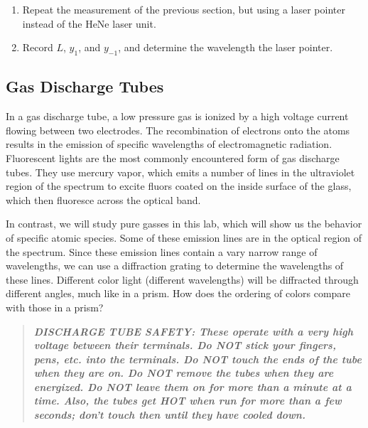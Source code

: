 \documentclass[12pt]{article}
\begin{document}
\begin{enumerate}
\item Repeat the measurement of the previous section, but using a
  laser pointer instead of the HeNe laser unit.  
\item Record $L$, $y_1$, and $y_{-1}$, and determine the wavelength
  the laser pointer.
\end{enumerate}

\subsection{Gas Discharge Tubes}
\label{sec:tubes}

In a gas discharge tube, a low pressure gas is ionized by a high
voltage current flowing between two electrodes.  The recombination of
electrons onto the atoms results in the emission of specific
wavelengths of electromagnetic radiation.  Fluorescent lights are the
most commonly encountered form of gas discharge tubes.  They use
mercury vapor, which emits a number of lines in the ultraviolet region
of the spectrum to excite fluors coated on the inside surface of the
glass, which then fluoresce across the optical band.

In contrast, we will study pure gasses in this lab, which will show us
the behavior of specific atomic species.  Some of these emission lines
are in the optical region of the spectrum.  Since these emission lines
contain a vary narrow range of wavelengths, we can use a diffraction
grating to determine the wavelengths of these lines.  Different color
light (different wavelengths) will be diffracted through different
angles, much like in a prism.  How does the ordering of colors compare
with those in a prism?

\begin{quote}
  \textbf{\textit{DISCHARGE TUBE SAFETY: These operate with a very
      high voltage between their terminals.  Do NOT stick your
      fingers, pens, etc. into the terminals.  Do NOT touch the ends
      of the tube when they are on.  Do NOT remove the tubes when they
      are energized. Do NOT leave them on for more than a minute at a
      time.  Also, the tubes get HOT when run for more than a few
      seconds; don't touch then until they have cooled down.}}
\end{quote}
\end{document}
